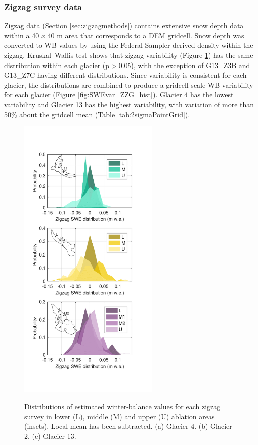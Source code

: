 \documentclass{sfuthesis}
\begin{document}
\subsubsection{Zigzag survey data}
Zigzag data (Section \ref{sec:zigzagmethods}) contains extensive snow depth data within a 40 $x$ 40 m area that corresponds to a DEM gridcell. Snow depth was converted to WB values by using the Federal Sampler-derived density within the zigzag. Kruskal--Wallis test shows that zigzag variability (Figure \ref{fig:SWEvar_ZZ_hist}) has the same distribution within each glacier (p$>$0.05), with the exception of G13\_Z3B and G13\_Z7C having different distributions. Since variability is consistent for each glacier, the distributions are combined to produce a gridcell-scale WB variability for each glacier (Figure \ref{fig:SWEvar_ZZG_hist}). Glacier 4 has the lowest variability and Glacier 13 has the highest variability, with variation of more than 50\% about the gridcell mean (Table  \ref{tab:2sigmaPointGrid}). 

\begin{figure}
	\centering
	\includegraphics[width =0.6\textwidth]{ZigzagHistogram.pdf}\\
	\caption{Distributions of estimated winter-balance values for each zigzag survey in lower (L), middle (M) and upper (U) ablation areas (insets). Local mean has been subtracted. (a) Glacier 4. (b) Glacier 2. (c) Glacier 13.}
	\label{fig:SWEvar_ZZ_hist}
\end{figure}
\end{document}
